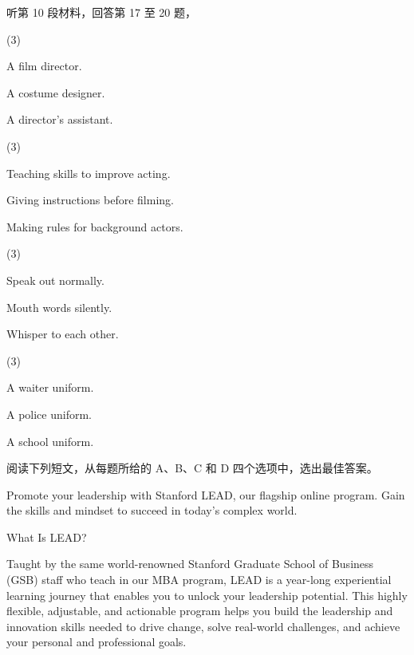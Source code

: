\documentclass{英语试卷}
\begin{document}
\par 听第 10 段材料，回答第 17 至 20 题，\par
{}
\begin{choices}(3)
  \item A film director.
  \item A costume designer.
  \item A director's assistant.
\end{choices}
\begin{choices}(3)
  \item Teaching skills to improve acting.
  \item Giving instructions before filming.
  \item Making rules for background actors.
\end{choices}
\begin{choices}(3)
  \item Speak out normally.
  \item Mouth words silently.
  \item Whisper to each other.
\end{choices}
\begin{choices}(3)
  \item A waiter uniform.
  \item A police uniform.
  \item A school uniform.
\end{choices}
\par 阅读下列短文，从每题所给的 A、B、C 和 D 四个选项中，选出最佳答案。\par
{}
\par Promote your leadership with Stanford LEAD, our flagship online program. Gain the skills and mindset to succeed in today's complex world.\par
\par What Is LEAD?\par
\par Taught by the same world-renowned Stanford Graduate School of Business (GSB) staff who teach in our MBA program, LEAD is a year-long experiential learning journey that enables you to unlock your leadership potential. This highly flexible, adjustable, and actionable program helps you build the leadership and innovation skills needed to drive change, solve real-world challenges, and achieve your personal and professional goals.\par
\end{document}
